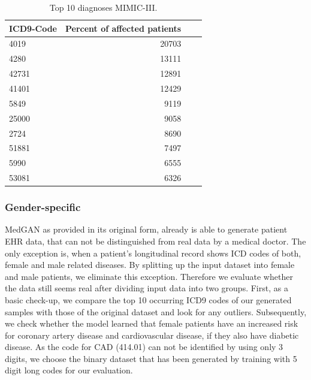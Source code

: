 \documentclass[11pt, a4paper]{book}
\begin{document}
\begin{table}
\begin{tabularx}{\textwidth}{p{}|r|X|r}
\textbf{ICD9-Code} & \textbf{Percent of affected patients}\\
\hline
4019 & 20703\\
4280   & 13111\\
42731    & 12891\\
41401    & 12429\\
5849      & 9119\\
25000     & 9058\\
2724     & 8690\\
51881    & 7497\\
5990     & 6555\\
53081    & 6326\\
\end{tabularx}
\caption{\label{tab:top10-icd-mimic}Top 10 diagnoses MIMIC-III.}
\end{table}

\subsubsection{Gender-specific}
MedGAN as provided in its original form, already is able to generate patient EHR data, that can not be distinguished from real data by a medical doctor. The only exception is, when a patient's longitudinal record shows ICD codes of both, female and male related diseases.  \cite{Choi2017}
By splitting up the input dataset into female and male patients, we eliminate this exception. Therefore we evaluate whether the data still seems real after dividing input data into two groups.
First, as a basic check-up, we compare the top 10 occurring ICD9 codes of our generated samples with those of the original dataset and look for any outliers. Subsequently, we check whether the model learned that female patients have an increased risk for coronary artery disease and cardiovascular disease, if they also have diabetic disease. As the code for CAD (414.01) can not be identified by using only 3 digits, we choose the binary dataset that has been generated by training with 5 digit long codes for our evaluation.
\end{document}
